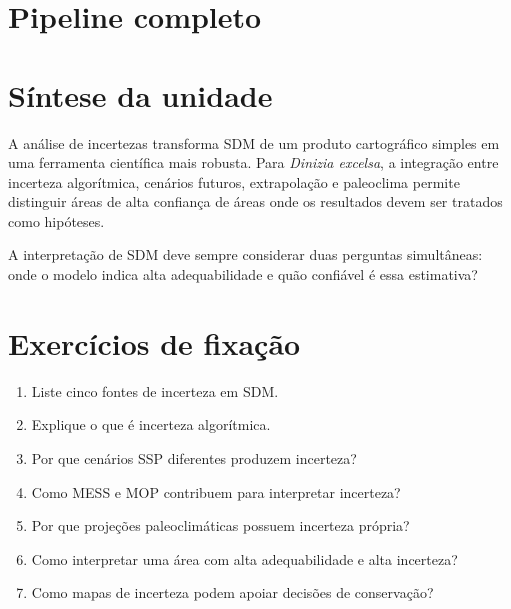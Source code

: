 \section{Pipeline completo}


\section{Síntese da unidade}

A análise de incertezas transforma SDM de um produto cartográfico simples em uma ferramenta científica mais robusta. Para \textit{Dinizia excelsa}, a integração entre incerteza algorítmica, cenários futuros, extrapolação e paleoclima permite distinguir áreas de alta confiança de áreas onde os resultados devem ser tratados como hipóteses.

\begin{conceito}[title={\faBook\quad Mensagem central}]
	A interpretação de SDM deve sempre considerar duas perguntas simultâneas: onde o modelo indica alta adequabilidade e quão confiável é essa estimativa?
\end{conceito}

\section{Exercícios de fixação}

\begin{enumerate}
	\item Liste cinco fontes de incerteza em SDM.
	\item Explique o que é incerteza algorítmica.
	\item Por que cenários SSP diferentes produzem incerteza?
	\item Como MESS e MOP contribuem para interpretar incerteza?
	\item Por que projeções paleoclimáticas possuem incerteza própria?
	\item Como interpretar uma área com alta adequabilidade e alta incerteza?
	\item Como mapas de incerteza podem apoiar decisões de conservação?
\end{enumerate}


